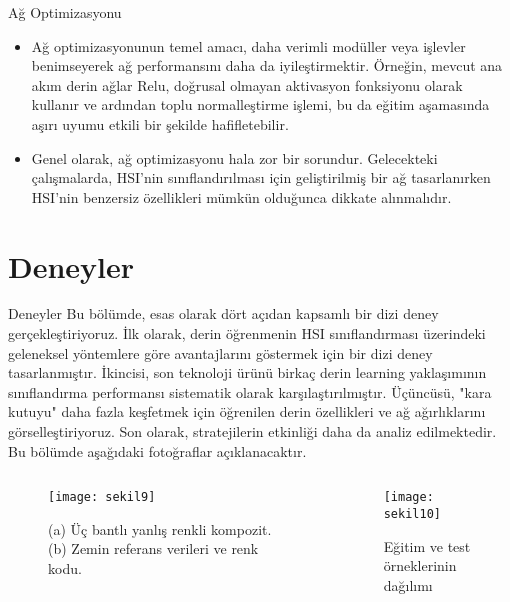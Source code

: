 \documentclass{beamer}
\begin{document}
\begin{frame}{Ağ Optimizasyonu}
\begin{itemize}
	\item Ağ optimizasyonunun temel amacı, daha verimli modüller veya işlevler benimseyerek ağ performansını daha da iyileştirmektir. Örneğin, mevcut ana akım derin ağlar Relu, doğrusal olmayan aktivasyon fonksiyonu olarak kullanır ve ardından toplu normalleştirme işlemi, bu da eğitim aşamasında aşırı uyumu etkili bir şekilde hafifletebilir.
	\item Genel olarak, ağ optimizasyonu hala zor bir sorundur. Gelecekteki çalışmalarda, HSI'nin sınıflandırılması için geliştirilmiş bir ağ tasarlanırken HSI'nin benzersiz özellikleri mümkün olduğunca dikkate alınmalıdır.
\end{itemize}
\end{frame}

\section{Deneyler}
\begin{frame}{Deneyler}
	Bu bölümde, esas olarak dört açıdan kapsamlı bir dizi deney gerçekleştiriyoruz. İlk olarak, derin öğrenmenin HSI sınıflandırması üzerindeki geleneksel yöntemlere göre avantajlarını göstermek için bir dizi deney tasarlanmıştır. İkincisi, son teknoloji ürünü birkaç derin learning yaklaşımının sınıflandırma performansı sistematik olarak karşılaştırılmıştır. Üçüncüsü, "kara kutuyu" daha fazla keşfetmek için öğrenilen derin özellikleri ve ağ ağırlıklarını görselleştiriyoruz. Son olarak, stratejilerin etkinliği daha da analiz edilmektedir. Bu bölümde aşağıdaki fotoğraflar açıklanacaktır.
\end{frame}

\begin{frame}
	\begin{columns}
		\begin{column}{0.5\textwidth}
			\begin{figure}[]
				\centering
				\texttt{[image: sekil9]}
				\label{fig:sekil5}
				\caption{(a) Üç bantlı yanlış renkli kompozit. (b) Zemin referans verileri ve renk kodu.} 
			\end{figure}
		\end{column}
		\begin{column}{0.5\textwidth}
			\begin{figure}[]
				\centering
				\texttt{[image: sekil10]}
				\caption{Eğitim ve test örneklerinin dağılımı}
				\label{fig:sekil6}
			\end{figure}
		\end{column}
	\end{columns}
\end{frame}
\end{document}
